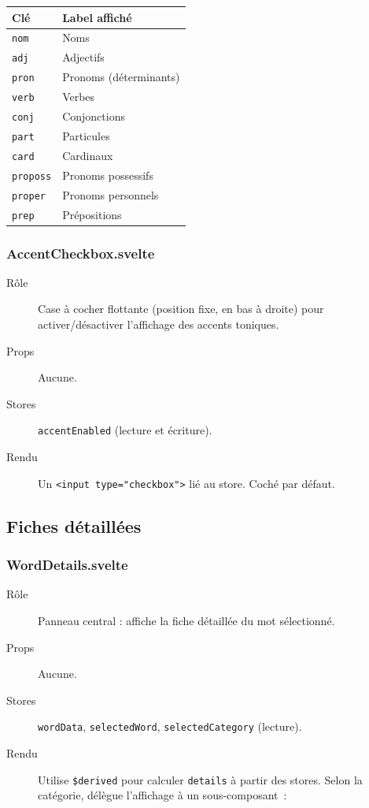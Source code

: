 \begin{center}
\begin{tabular}{ll}
  \toprule
  \textbf{Clé} & \textbf{Label affiché} \\
  \midrule
  \texttt{nom} & Noms \\
  \texttt{adj} & Adjectifs \\
  \texttt{pron} & Pronoms (déterminants) \\
  \texttt{verb} & Verbes \\
  \texttt{conj} & Conjonctions \\
  \texttt{part} & Particules \\
  \texttt{card} & Cardinaux \\
  \texttt{proposs} & Pronoms possessifs \\
  \texttt{proper} & Pronoms personnels \\
  \texttt{prep} & Prépositions \\
  \bottomrule
\end{tabular}
\end{center}

\subsubsection{AccentCheckbox.svelte}

\begin{description}
  \item[Rôle] Case à cocher flottante (position fixe, en bas à droite) pour activer/désactiver l'affichage des accents toniques.
  \item[Props] Aucune.
  \item[Stores] \texttt{accentEnabled} (lecture et écriture).
  \item[Rendu] Un \texttt{<input type="checkbox">} lié au store. Coché par défaut.
\end{description}

\subsection{Fiches détaillées}

\subsubsection{WordDetails.svelte}

\begin{description}
  \item[Rôle] Panneau central : affiche la fiche détaillée du mot sélectionné.
  \item[Props] Aucune.
  \item[Stores] \texttt{wordData}, \texttt{selectedWord}, \texttt{selectedCategory} (lecture).
  \item[Rendu] Utilise \texttt{\$derived} pour calculer \texttt{details} à partir des stores. Selon la catégorie, délègue l'affichage à un sous-composant~:
\end{description}

